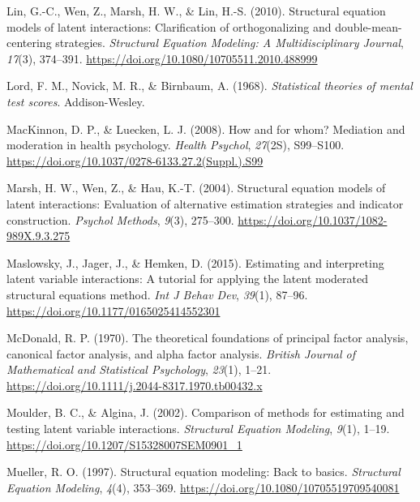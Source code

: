 \documentclass[
  man]{apa6}
\newlength{\cslhangindent}
\newenvironment{CSLReferences}[2] %
 {\begin{list}{}{%
  \setlength{\itemindent}{0pt}
  \setlength{\leftmargin}{0pt}
  \setlength{\parsep}{0pt}
  \ifodd #1
   \setlength{\leftmargin}{\cslhangindent}
   \setlength{\itemindent}{-1\cslhangindent}
  \fi
  \setlength{\itemsep}{#2\baselineskip}}}
 {\end{list}}
\begin{document}
\begin{CSLReferences}{1}{0}
Lin, G.-C., Wen, Z., Marsh, H. W., \& Lin, H.-S. (2010). Structural equation models of latent interactions: {Clarification} of orthogonalizing and double-mean-centering strategies. \emph{Structural Equation Modeling: A Multidisciplinary Journal}, \emph{17}(3), 374--391. \url{https://doi.org/10.1080/10705511.2010.488999}

Lord, F. M., Novick, M. R., \& Birnbaum, A. (1968). \emph{Statistical theories of mental test scores}. Addison-Wesley.

MacKinnon, D. P., \& Luecken, L. J. (2008). How and for whom? {Mediation} and moderation in health psychology. \emph{Health Psychol}, \emph{27}(2S), S99--S100. \url{https://doi.org/10.1037/0278-6133.27.2(Suppl.).S99}

Marsh, H. W., Wen, Z., \& Hau, K.-T. (2004). Structural equation models of latent interactions: Evaluation of alternative estimation strategies and indicator construction. \emph{Psychol Methods}, \emph{9}(3), 275--300. \url{https://doi.org/10.1037/1082-989X.9.3.275}

Maslowsky, J., Jager, J., \& Hemken, D. (2015). Estimating and interpreting latent variable interactions: {A} tutorial for applying the latent moderated structural equations method. \emph{Int J Behav Dev}, \emph{39}(1), 87--96. \url{https://doi.org/10.1177/0165025414552301}

McDonald, R. P. (1970). The theoretical foundations of principal factor analysis, canonical factor analysis, and alpha factor analysis. \emph{British Journal of Mathematical and Statistical Psychology}, \emph{23}(1), 1--21. \url{https://doi.org/10.1111/j.2044-8317.1970.tb00432.x}

Moulder, B. C., \& Algina, J. (2002). Comparison of methods for estimating and testing latent variable interactions. \emph{Structural Equation Modeling}, \emph{9}(1), 1--19. \url{https://doi.org/10.1207/S15328007SEM0901_1}

Mueller, R. O. (1997). Structural equation modeling: {Back} to basics. \emph{Structural Equation Modeling}, \emph{4}(4), 353--369. \url{https://doi.org/10.1080/10705519709540081}


\end{CSLReferences}
\end{document}
